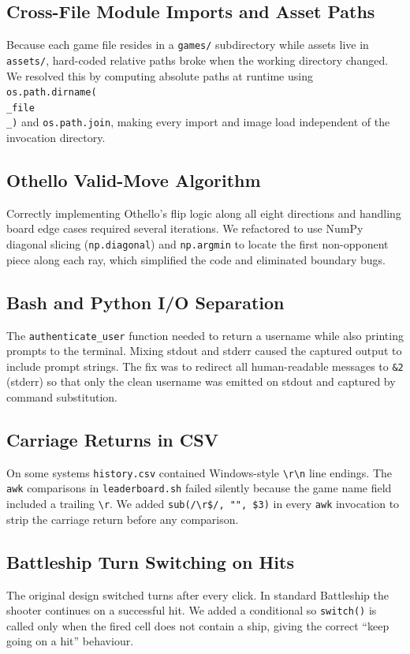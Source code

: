 \documentclass[12pt,a4paper]{article}
\begin{document}
\subsection{Cross-File Module Imports and Asset Paths}
Because each game file resides in a \texttt{games/} subdirectory while assets live in
\texttt{assets/}, hard-coded relative paths broke when the working directory changed. We
resolved this by computing absolute paths at runtime using \texttt{os.path.dirname(\\_file\\_)}
and \texttt{os.path.join}, making every import and image load independent of the invocation
directory.

\subsection{Othello Valid-Move Algorithm}
Correctly implementing Othello's flip logic along all eight directions and handling board edge
cases required several iterations. We refactored to use NumPy diagonal slicing
(\texttt{np.diagonal}) and \texttt{np.argmin} to locate the first non-opponent piece along
each ray, which simplified the code and eliminated boundary bugs.

\subsection{Bash and Python I/O Separation}
The \texttt{authenticate\_user} function needed to return a username while also printing
prompts to the terminal. Mixing stdout and stderr caused the captured output to include prompt
strings. The fix was to redirect all human-readable messages to \texttt{\&2} (stderr) so that
only the clean username was emitted on stdout and captured by command substitution.

\subsection{Carriage Returns in CSV}
On some systems \texttt{history.csv} contained Windows-style \texttt{\textbackslash r\textbackslash n}
line endings. The \texttt{awk} comparisons in \texttt{leaderboard.sh} failed silently because
the game name field included a trailing \texttt{\textbackslash r}. We added
\texttt{sub(/\textbackslash r\$/, "", \$3)} in every \texttt{awk} invocation to strip the
carriage return before any comparison.

\subsection{Battleship Turn Switching on Hits}
The original design switched turns after every click. In standard Battleship the shooter
continues on a successful hit. We added a conditional so \texttt{switch()} is called only when
the fired cell does not contain a ship, giving the correct ``keep going on a hit'' behaviour.
\end{document}
